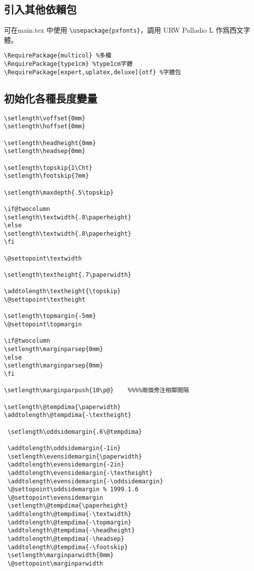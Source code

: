 \subsection{引入其他依賴包}
\par 可在main.tex 中使用 \verb+\usepackage{pxfonts}+，調用 URW Palladio L 作爲西文字體。
\begin{lstlisting}[firstnumber=515]
\RequirePackage{multicol} %多欄
\RequirePackage{type1cm} %type1cm字體
\RequirePackage[expert,uplatex,deluxe]{otf} %字體包
\end{lstlisting}

\subsection{初始化各種長度變量}

\begin{lstlisting}[firstnumber=519]
\setlength\voffset{0mm}
\setlength\hoffset{0mm}

\setlength\headheight{0mm}
\setlength\headsep{0mm}

\setlength\topskip{1\Cht}
\setlength\footskip{7mm}

\setlength\maxdepth{.5\topskip}

\if@twocolumn
\setlength\textwidth{.8\paperheight}
\else
\setlength\textwidth{.8\paperheight}
\fi

\@settopoint\textwidth

\setlength\textheight{.7\paperwidth}

\addtolength\textheight{\topskip}
\@settopoint\textheight

\setlength\topmargin{-5mm}
\@settopoint\topmargin

\if@twocolumn
\setlength\marginparsep{0mm}
\else
\setlength\marginparsep{0mm}
\fi

\setlength\marginparpush{10\p@}    %%%%兩個旁注相鄰間隔

\setlength\@tempdima{\paperwidth}
\addtolength\@tempdima{-\textheight}

 \setlength\oddsidemargin{.6\@tempdima}

 \addtolength\oddsidemargin{-1in}
 \setlength\evensidemargin{\paperwidth}
 \addtolength\evensidemargin{-2in}
 \addtolength\evensidemargin{-\textheight}
 \addtolength\evensidemargin{-\oddsidemargin}
 \@settopoint\oddsidemargin % 1999.1.6
 \@settopoint\evensidemargin
 \setlength\@tempdima{\paperheight}
 \addtolength\@tempdima{-\textwidth}
 \addtolength\@tempdima{-\topmargin}
 \addtolength\@tempdima{-\headheight}
 \addtolength\@tempdima{-\headsep}
 \addtolength\@tempdima{-\footskip}
 \setlength\marginparwidth{0mm}
 \@settopoint\marginparwidth


\end{lstlisting}
